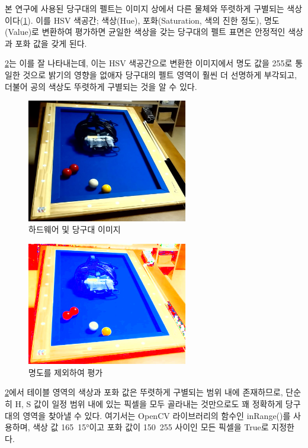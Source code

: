 \documentclass[10pt]{oblivoir}
\begin{document}
본 연구에 사용된 당구대의 펠트는 이미지 상에서 다른 물체와 뚜렷하게 구별되는 색상이다(\cref{fig;table}). 이를 HSV 색공간; 색상(Hue), 포화(Saturation, 색의 진한 정도), 명도(Value)로 변환하여 평가하면 균일한 색상을 갖는 당구대의 펠트 표면은 안정적인 색상과 포화 값을 갖게 된다. 

\cref{fig;table-hsv-coloronly}는 이를 잘 나타내는데, 이는 HSV 색공간으로 변환한 이미지에서 명도 값을 255로 통일한 것으로 밝기의 영향을 없애자 당구대의 펠트 영역이 훨씬 더 선명하게 부각되고, 더불어 공의 색상도 뚜렷하게 구별되는 것을 알 수 있다.

\begin{figure}[ht]
    \centering
    \includegraphics[width=7cm]{img/billiards-table.png}
    \caption{하드웨어 및 당구대 이미지}
    \label{fig;table}
\end{figure}

\begin{figure}[ht]
    \centering
    \includegraphics[width=7cm]{img/table-coloronly.png}
    \caption{명도를 제외하여 평가}
    \label{fig;table-hsv-coloronly}
\end{figure}

\cref{fig;table-hsv-coloronly}에서 테이블 영역의 색상과 포화 값은 뚜렷하게 구별되는 범위 내에 존재하므로, 단순히 H, S 값이 일정 범위 내에 있는 픽셀을 모두 골라내는 것만으로도 꽤 정확하게 당구대의 영역을 찾아낼 수 있다. 여기서는 OpenCV 라이브러리의 함수인 inRange()를 사용하며, 색상 값 165~15\si{\degree}이고 포화 값이 150~255 사이인 모든 픽셀을 True로 지정한다.
\end{document}
